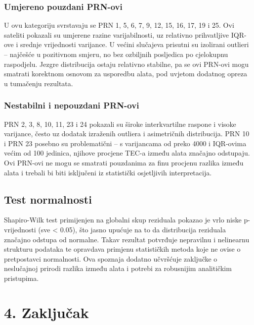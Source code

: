 \documentclass[
]{article}
\begin{document}
\subsubsection{Umjereno pouzdani
PRN-ovi}\label{umjereno-pouzdani-prn-ovi}

U ovu kategoriju svrstavaju se PRN 1, 5, 6, 7, 9, 12, 15, 16, 17, 19 i
25. Ovi sateliti pokazali su umjerene razine varijabilnosti, uz
relativno prihvatljive IQR-ove i srednje vrijednosti varijance. U većini
slučajeva prisutni su izolirani outlieri -- najčešće u pozitivnom
smjeru, no bez ozbiljnih posljedica po cjelokupnu raspodjelu. Jezgre
distribucija ostaju relativno stabilne, pa se ovi PRN-ovi mogu smatrati
korektnom osnovom za usporedbu alata, pod uvjetom dodatnog opreza u
tumačenju rezultata.

\subsubsection{Nestabilni i nepouzdani
PRN-ovi}\label{nestabilni-i-nepouzdani-prn-ovi}

PRN 2, 3, 8, 10, 11, 23 i 24 pokazali su široke interkvartilne raspone i
visoke varijance, često uz dodatak izraženih outliera i asimetričnih
distribucija. PRN 10 i PRN 23 posebno su problematični -- s varijancama
od preko 4000 i IQR-ovima većim od 100 jedinica, njihove procjene TEC-a
između alata značajno odstupaju. Ovi PRN-ovi ne mogu se smatrati
pouzdanima za finu procjenu razlika između alata i trebali bi biti
isključeni iz statistički osjetljivih interpretacija.

\subsection{Test normalnosti}\label{test-normalnosti}

Shapiro-Wilk test primijenjen na globalni skup reziduala pokazao je vrlo
niske p-vrijednosti (sve \textless{} 0.05), što jasno upućuje na to da
distribucija reziduala značajno odstupa od normalne. Takav rezultat
potvrđuje nepravilnu i nelinearnu strukturu podataka te opravdava
primjenu statističkih metoda koje ne ovise o pretpostavci normalnosti.
Ova spoznaja dodatno učvršćuje zaključke o neslučajnoj prirodi razlika
između alata i potrebi za robusnijim analitičkim pristupima.

\section{4. Zaključak}\label{zakljuux10dak}
\end{document}
